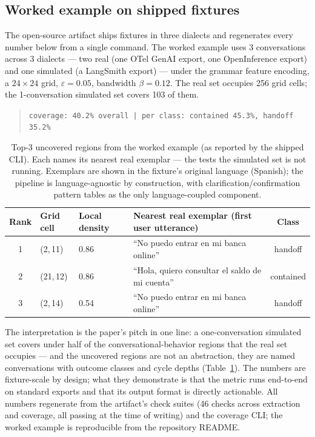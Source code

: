 \subsection{Worked example on shipped fixtures}
The open-source artifact ships fixtures in three dialects and regenerates every number below
from a single command.
The worked example uses 3 conversations across 3 dialects --- two real (one OTel GenAI export,
one OpenInference export) and one simulated (a LangSmith export) --- under the grammar feature
encoding, a $24 \times 24$ grid, $\varepsilon = 0.05$, bandwidth $\beta = 0.12$.
The real set occupies 256 grid cells; the 1-conversation simulated set covers 103 of them.

\begin{quote}
\small
\texttt{coverage: 40.2\% overall | per class: contained 45.3\%, handoff 35.2\%}
\end{quote}

\begin{table}[t]
\centering
\small
\begin{tabular}{@{}clllc@{}}
\toprule
\textbf{Rank} & \textbf{Grid cell} & \textbf{Local density} & \textbf{Nearest real exemplar (first user utterance)} & \textbf{Class} \\
\midrule
1 & (2,\,11)  & 0.86 & ``No puedo entrar en mi banca online'' & handoff \\
2 & (21,\,12) & 0.86 & ``Hola, quiero consultar el saldo de mi cuenta'' & contained \\
3 & (2,\,14)  & 0.54 & ``No puedo entrar en mi banca online'' & handoff \\
\bottomrule
\end{tabular}
\caption{Top-3 uncovered regions from the worked example (as reported by the shipped CLI).
Each names its nearest real exemplar --- the tests the simulated set is not running.
Exemplars are shown in the fixture's original language (Spanish); the pipeline is
language-agnostic by construction, with clarification/confirmation pattern tables as the only
language-coupled component.}
\label{tab:topk}
\end{table}

The interpretation is the paper's pitch in one line: a one-conversation simulated set covers
under half of the conversational-behavior regions that the real set occupies --- and the
uncovered regions are not an abstraction, they are named conversations with outcome classes
and cycle depths (Table~\ref{tab:topk}).
The numbers are fixture-scale by design; what they demonstrate is that the metric runs
end-to-end on standard exports and that its output format is directly actionable.
All numbers regenerate from the artifact's check suites (46 checks across extraction and
coverage, all passing at the time of writing) and the coverage CLI; the worked example is
reproducible from the repository README.

